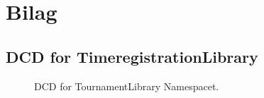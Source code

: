 \newpage
\section{Bilag}
\subsection{DCD for TimeregistrationLibrary}


\begin{figure}[H]
    \caption{DCD for TournamentLibrary Namespacet.}
    \label{fig:DCDLib}
\end{figure}